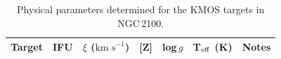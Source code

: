 \documentclass[useAMS,usenatbib]{mn2e}
\def\kms{$\mbox{km s}^{-1}$}
\def\pp{$\phantom{-}$}
\def\o{$\phantom{0}$}
\begin{document}
\begin{table}
\begin{center}
\caption{
Physical parameters determined for the KMOS targets in NGC\,2100.
\label{tb:stellar-params}
         }
\scriptsize
\begin{threeparttable}
\begin{tabular}{lc ccccl}
 \hline
 \hline
  Target  & IFU & $\xi$ (\kms) & [Z] & log\,$g$ & T$_{\rm eff}$ (K) & Notes\tnote{a}\\
  \hline


\end{tabular}
\end{threeparttable}
\end{center}
\end{table}
\end{document}
